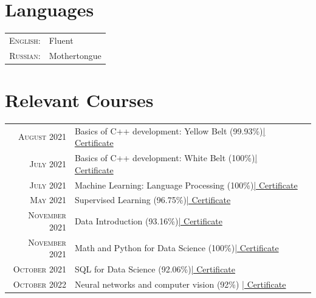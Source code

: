 \documentclass[a4paper,10pt]{article} %
\begin{document}


\section{Languages}

\begin{tabular}{rl}
\textsc{English:} & Fluent\\

\textsc{Russian:} & Mothertongue\\

\end{tabular}


\section{Relevant Courses}
\begin{tabular}{rp{11cm}r}
    \textsc{August 2021} & Basics of C++ development: Yellow Belt \footnotesize(99.93\%)\normalsize\href{https://coursera.org/share/bd93be1044642b0f76be5859fbf1b96f}{\hfill | \footnotesize Certificate}\\
    \textsc{July 2021} &  Basics of C++ development: White Belt \footnotesize(100\%)\normalsize\href{https://coursera.org/share/f696a9c66143059a301f9f1e5d2bcca8}{\hfill | \footnotesize Certificate}\\
    \textsc{July 2021} &  Machine Learning: Language Processing \footnotesize(100\%)\normalsize\href{https://coursera.org/share/f91409b5a5184193be1017168afb7952}{\hfill | \footnotesize Certificate}\\
    \textsc{May 2021} & Supervised Learning \footnotesize(96.75\%)\normalsize\href{https://coursera.org/share/c877829114f8b67d7cc8a44057f4e571}{\hfill | \footnotesize Certificate}\\
    \textsc{November 2021} & Data Introduction \footnotesize(93.16\%)\normalsize\href{https://coursera.org/share/bd93be1044642b0f76be5859fbf1b96f}{\hfill | \footnotesize Certificate}\\
    \textsc{November 2021} & Math and Python for Data Science \footnotesize(100\%)\normalsize\href{https://coursera.org/share/b5ca152259931c53eb6cc4fff4203582}{\hfill | \footnotesize Certificate}\\
    \textsc{October 2021} & SQL for Data Science \footnotesize(92.06\%)\normalsize\href{https://coursera.org/share/8cf7fb85c6eed6291d92f67fcede0d92}{\hfill | \footnotesize Certificate}\\
    \textsc{October 2022} & Neural networks and computer vision \footnotesize(92\%) \normalsize\href{https://stepik.org/cert/1054595s}{\hfill | \footnotesize Certificate}
\end{tabular}
\end{document}
